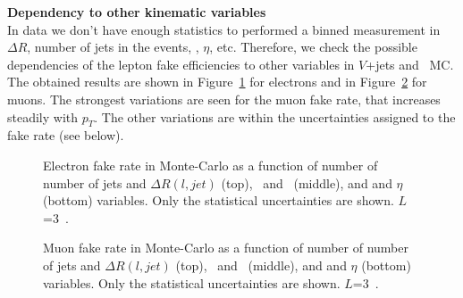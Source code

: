 \par{\bf Dependency to other kinematic variables\\}
In data we don't have enough statistics to performed a binned measurement in $\Delta R$, number of jets in the events, \met, $\eta$, etc. 
Therefore, we check the possible dependencies of the lepton fake efficiencies to other variables in $V$+jets and \ttbar\ MC. 
The obtained results are shown in Figure~\ref{Fig:Fake_Rate_ELE_Variations} for electrons and in Figure~\ref{Fig:Fake_Rate_MU_Variations} for muons. 
The strongest variations are seen for the muon fake rate, that increases steadily with $p_T$. 
The other variations are within the uncertainties assigned to the fake rate (see below). 

\begin{figure}[hp!]
\centering
{}   
\vspace{-0.2cm}
\caption{Electron fake rate in Monte-Carlo as a function of number of number of jets and $\Delta R(l, jet)$ (top), \meff\ and \met\ (middle), and \pt and $\eta$ (bottom) variables. Only the statistical uncertainties are shown. $L$=3~\ifb.}
\label{Fig:Fake_Rate_ELE_Variations}  
\end{figure}
\begin{figure}[hp!]
\centering
{}   
\vspace{-0.2cm}
\caption{Muon fake rate in Monte-Carlo as a function of number of number of jets and $\Delta R(l, jet)$ (top), \meff\ and \met\ (middle), and \pt and $\eta$ (bottom) variables. Only the statistical uncertainties are shown. $L$=3~\ifb.}
\label{Fig:Fake_Rate_MU_Variations}  
\end{figure}


